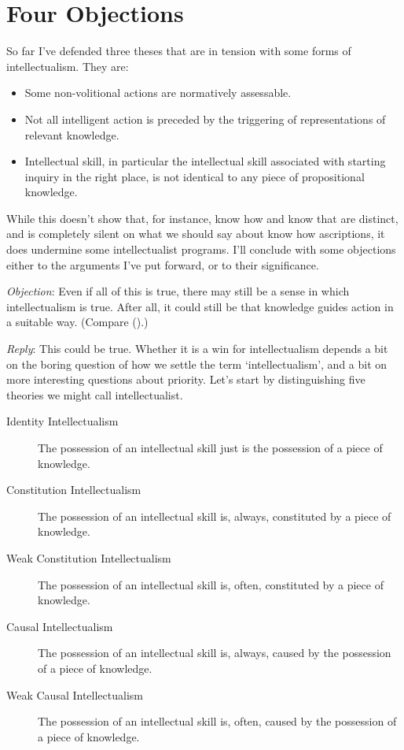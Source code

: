 \documentclass[
  11pt,
  letterpaper,
  DIV=11,
  numbers=noendperiod,
  oneside]{scrartcl}
\providecommand{\tightlist}{%
  \setlength{\itemsep}{0pt}\setlength{\parskip}{0pt}}\usepackage{longtable,booktabs,array}
\begin{document}
\section{Four Objections}\label{fourobjections}

So far I've defended three theses that are in tension with some forms of
intellectualism. They are:

\begin{itemize}
\tightlist
\item
  Some non-volitional actions are normatively assessable.
\item
  Not all intelligent action is preceded by the triggering of
  representations of relevant knowledge.
\item
  Intellectual skill, in particular the intellectual skill associated
  with starting inquiry in the right place, is not identical to any
  piece of propositional knowledge.
\end{itemize}

While this doesn't show that, for instance, know how and know that are
distinct, and is completely silent on what we should say about know how
ascriptions, it does undermine some intellectualist programs. I'll
conclude with some objections either to the arguments I've put forward,
or to their significance.

\emph{Objection}: Even if all of this is true, there may still be a
sense in which intellectualism is true. After all, it could still be
that knowledge guides action in a suitable way. (Compare
().)

\emph{Reply}: This could be true. Whether it is a win for
intellectualism depends a bit on the boring question of how we settle
the term `intellectualism', and a bit on more interesting questions
about priority. Let's start by distinguishing five theories we might
call intellectualist.

\begin{description}
\item[Identity Intellectualism]
The possession of an intellectual skill just is the possession of a
piece of knowledge.
\item[Constitution Intellectualism]
The possession of an intellectual skill is, always, constituted by a
piece of knowledge.
\item[Weak Constitution Intellectualism]
The possession of an intellectual skill is, often, constituted by a
piece of knowledge.
\item[Causal Intellectualism]
The possession of an intellectual skill is, always, caused by the
possession of a piece of knowledge.
\item[Weak Causal Intellectualism]
The possession of an intellectual skill is, often, caused by the
possession of a piece of knowledge.
\end{description}
\end{document}

